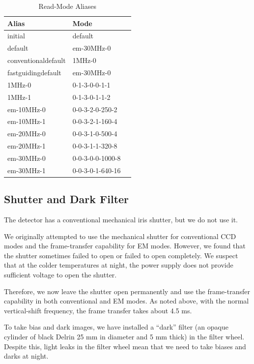\begin{table}
\caption{Read-Mode Aliases}
\label{table:read-mode-aliases}
\begin{center}
\begin{tabular}{lll}
\hline
Alias&Mode\\
\hline
 initial&default\\
 default&em-30MHz-0\\
 conventionaldefault&1MHz-0\\
 fastguidingdefault&em-30MHz-0\\
 1MHz-0&0-1-3-0-0-1-1\\
 1MHz-1&0-1-3-0-1-1-2\\
 em-10MHz-0&0-0-3-2-0-250-2\\
 em-10MHz-1&0-0-3-2-1-160-4\\
 em-20MHz-0&0-0-3-1-0-500-4\\
 em-20MHz-1&0-0-3-1-1-320-8\\
 em-30MHz-0&0-0-3-0-0-1000-8\\
 em-30MHz-1&0-0-3-0-1-640-16\\
 \hline
\end{tabular}
\end{center}
\end{table}

\subsection{Shutter and Dark Filter}

\label{section:shutter}

The detector has a conventional mechanical iris shutter, but we do not use it.

We originally attempted to use the mechanical shutter for conventional CCD modes and the frame-transfer capability for EM modes. However, we found that the shutter sometimes failed to open or failed to open completely. We suspect that at the colder temperatures at night, the power supply does not provide sufficient voltage to open the shutter. 

Therefore, we now leave the shutter open permanently and use the frame-transfer capability in both conventional and EM modes. As noted above, with the normal vertical-shift frequency, the frame transfer takes about 4.5 ms.

To take bias and dark images, we have installed a “dark” filter (an opaque cylinder of black Delrin 25 mm in diameter and 5 mm thick) in the filter wheel. Despite this, light leaks in the filter wheel mean that we need to take biases and darks at night.

